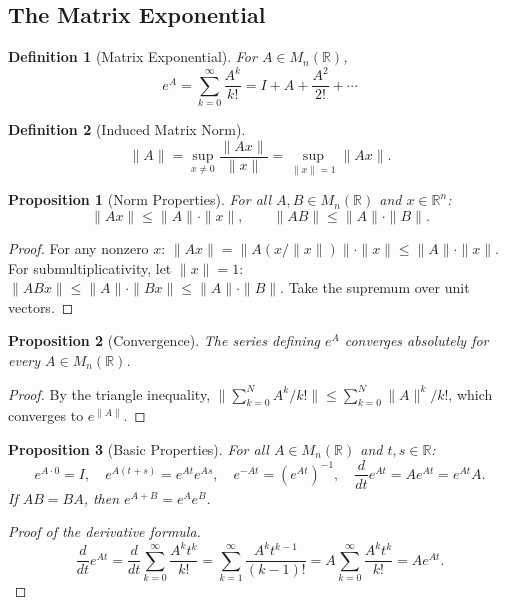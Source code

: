 \documentclass{article}
\newtheorem{definition}{Definition}
\newtheorem{proposition}{Proposition}
\newcommand{\R}{\mathbb{R}}
\begin{document}
\subsection{The Matrix Exponential}

\begin{definition}[Matrix Exponential]
    For $A \in M_n(\R)$,
    \[e^A = \sum_{k=0}^{\infty} \frac{A^k}{k!} = I + A + 
    \frac{A^2}{2!} + \cdots\]
\end{definition}

\begin{definition}[Induced Matrix Norm]
    \[\|A\| = \sup_{x \neq 0}\frac{\|Ax\|}{\|x\|} = 
    \sup_{\|x\|=1}\|Ax\|.\]
\end{definition}

\begin{proposition}[Norm Properties]
    For all $A, B \in M_n(\R)$ and $x \in \R^n$:
    \[\|Ax\| \leq \|A\|\cdot\|x\|, \qquad 
    \|AB\| \leq \|A\|\cdot\|B\|.\]
\end{proposition}

\begin{proof}
    For any nonzero $x$: $\|Ax\| = \|A(x/\|x\|)\|\cdot\|x\| 
    \leq \|A\|\cdot\|x\|$. For submultiplicativity, let $\|x\|=1$:
    $\|ABx\| \leq \|A\|\cdot\|Bx\| \leq \|A\|\cdot\|B\|$. Take the 
    supremum over unit vectors.
\end{proof}

\begin{proposition}[Convergence]
    The series defining $e^A$ converges absolutely for every 
    $A \in M_n(\R)$.
\end{proposition}

\begin{proof}
    By the triangle inequality, 
    $\|\sum_{k=0}^N A^k/k!\| \leq \sum_{k=0}^N \|A\|^k/k!$, 
    which converges to $e^{\|A\|}$.
\end{proof}

\begin{proposition}[Basic Properties]
    For all $A \in M_n(\R)$ and $t, s \in \R$:
    \[e^{A\cdot 0} = I, \quad e^{A(t+s)} = e^{At}e^{As}, \quad 
    e^{-At} = (e^{At})^{-1}, \quad \frac{d}{dt}e^{At} = Ae^{At} 
    = e^{At}A.\]
    If $AB = BA$, then $e^{A+B} = e^A e^B$.
\end{proposition}

\begin{proof}[Proof of the derivative formula]
    \[\frac{d}{dt}e^{At} = \frac{d}{dt}\sum_{k=0}^\infty 
    \frac{A^k t^k}{k!} = \sum_{k=1}^\infty \frac{A^k t^{k-1}}
    {(k-1)!} = A\sum_{k=0}^\infty \frac{A^k t^k}{k!} = Ae^{At}.\]
\end{proof}
\end{document}
